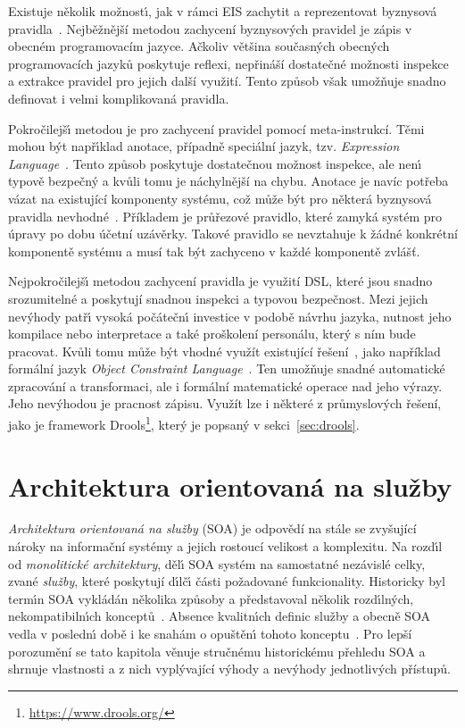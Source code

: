 Existuje několik možnost\'{\i}, jak v rámci \gls{EIS} zachytit a reprezentovat byznysová
pravidla~\cite{cemus2015automated}. Nejběžnější metodou zachycení byznysových pravidel je zápis
v obecném programovacím jazyce. Ačkoliv většina současných obecných programovacích
jazyků poskytuje reflexi, nepřináší dostatečné možnosti inspekce a extrakce pravidel pro jejich další
využití. Tento způsob však umožňuje snadno definovat i velmi komplikovaná pravidla.

Pokročilejš\'{\i} metodou je pro zachycení pravidel pomocí meta-instrukcí.
Těmi mohou být např\'{\i}klad anotace, případně speciální jazyk, tzv. \textit{Expression
Language}~\cite{nemuraite2008representation}. Tento způsob poskytuje dostatečnou možnost inspekce, ale nen\'{\i}
typově bezpečný a kvůli tomu je náchylnější na chybu. Anotace je navíc potřeba vázat na existující komponenty
systému, což může být pro některá byznysová pravidla nevhodné~\cite{cemus2015automated}.
Příkladem je průřezové pravidlo, které zamyká systém pro úpravy po dobu účetní uzávěrky. Takové pravidlo se
nevztahuje k žádné konkrétní komponentě systému a musí tak být zachyceno v každé komponentě zvlášť.

Nejpokročilejš\'{\i} metodou zachycení pravidla je využití \gls{DSL}, které jsou snadno srozumitelné a
poskytují snadnou inspekci a typovou bezpečnost. Mezi jejich nev\'yhody patř\'{\i} vysoká počátečn\'{\i} investice
v podobě návrhu jazyka, nutnost jeho kompilace nebo interpretace a také proškolení personálu, který s ním bude pracovat.
Kvůli tomu může být vhodné využít existující řešení~\cite{cemus2015automated}, jako například formální jazyk
\textit{Object Constraint Language}~\cite{warmer1998object}. Ten umožňuje snadné automatické zpracování a transformaci,
ale i formální matematické operace nad jeho výrazy. Jeho nevýhodou je pracnost zápisu. Využít lze i některé z průmyslových
řešení, jako je framework Drools\footnote{\url{https://www.drools.org/}}, který je popsaný v sekci~\ref{sec:drools}.

\section{Architektura orientovaná na služby}\label{sec:soa}

\textit{Architektura orientovaná na služby} (\gls{SOA}) je odpovědí na stále se zvyšující
nároky na informační systémy a jejich rostoucí velikost a komplexitu. Na rozd\'{\i}l od \textit{monolitické architektury},
děl\'{\i} \gls{SOA} systém na samostatné nezávislé celky, zvané \textit{služby}, které
poskytují d\'{\i}lč\'{\i} části požadované funkcionality.
Historicky byl term\'{\i}n \gls{SOA} vykládán několika způsoby a představoval
několik rozd\'{\i}ln\'ych, nekompatibiln\'{\i}ch konceptů~\cite{fowler2005serviceorientedambiguity}.
Absence kvalitn\'{\i}ch definic služby a obecně \gls{SOA} vedla v posledn\'{\i} době i ke snahám
o opuštěn\'{\i} tohoto konceptu~\cite{cerny2017disambiguation}.
Pro lepší porozumění se tato kapitola věnuje stručnému historickému přehledu \gls{SOA}
a shrnuje vlastnosti a z nich vyplývající výhody a nevýhody jednotlivých přístupů.

